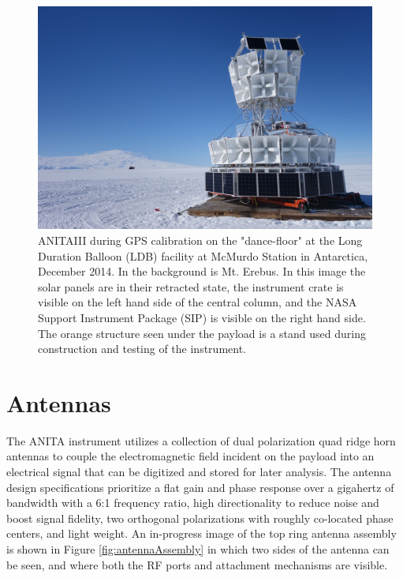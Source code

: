 \begin{figure}
\centering
	\includegraphics[width=\textwidth]{figures/ANITA3_dancefloor}
	\caption{ANITAIII during GPS calibration on the "dance-floor" at the Long Duration Balloon (LDB) facility at McMurdo Station in Antarctica, December 2014.  In the background is Mt. Erebus.  In this image the solar panels are in their retracted state, the instrument crate is visible on the left hand side of the central column, and the NASA Support Instrument Package (SIP) is visible on the right hand side. The orange structure seen under the payload is a stand used during construction and testing of the instrument.}
	\label{fig:ANITA3_dancefloor}
\end{figure}



	

\section{Antennas}
	The ANITA instrument utilizes a collection of dual polarization quad ridge horn antennas to couple the electromagnetic field incident on the payload into an electrical signal that can be digitized and stored for later analysis.  The antenna design specifications prioritize a flat gain and phase response over a gigahertz of bandwidth with a 6:1 frequency ratio, high directionality to reduce noise and boost signal fidelity, two orthogonal polarizations with roughly co-located phase centers, and light weight. 	An in-progress image of the top ring antenna assembly is shown in Figure \ref{fig:antennaAssembly} in which two sides of the antenna can be seen, and where both the RF ports and attachment mechanisms are visible.
	

